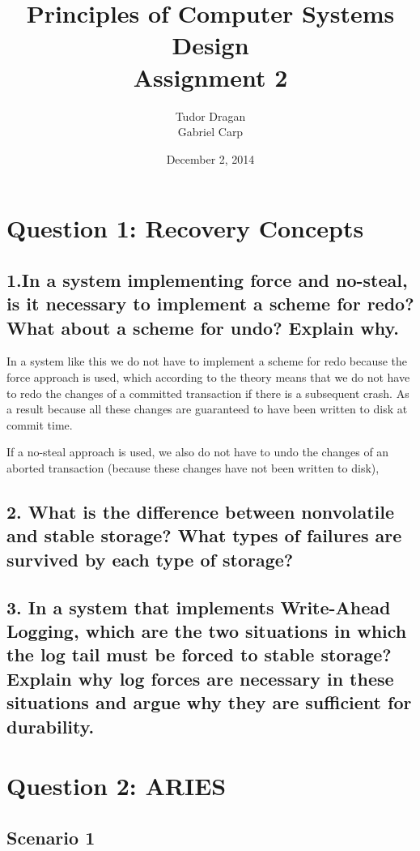 \documentclass{article}      %
\title{\bf Principles of Computer Systems Design\\ {\Large Assignment 2}}  %
\author{Tudor Dragan\\
Gabriel Carp}      %
\date{December 2, 2014}      %
\begin{document}

\maketitle                   %

\section*{Question 1: Recovery Concepts} 


\subsection*{1.In a system implementing force and no-steal, is it necessary to implement a scheme for redo? What about a scheme for undo? Explain why.}
In a system like this we do not have to implement a scheme for redo because the force approach is used, which according to the theory means that we do not have to redo the changes of a committed transaction if there is a subsequent crash. As a result because all these changes are guaranteed to have been written to disk at commit time.  

If a no-steal approach is used,
we also do not have to undo the changes of an aborted transaction (because these changes have not been written to disk),


\subsection*{2.  What is the difference between nonvolatile and stable storage? What types of failures are survived by each type of storage?}

\subsection*{3.  In a system that implements Write-Ahead Logging, which are the two situations in which the log tail must be forced to stable storage? Explain why log forces are necessary in these situations and argue why they are sufficient for durability.}

\section*{Question 2: ARIES}

\subsection*{Scenario 1}
\end{document}

